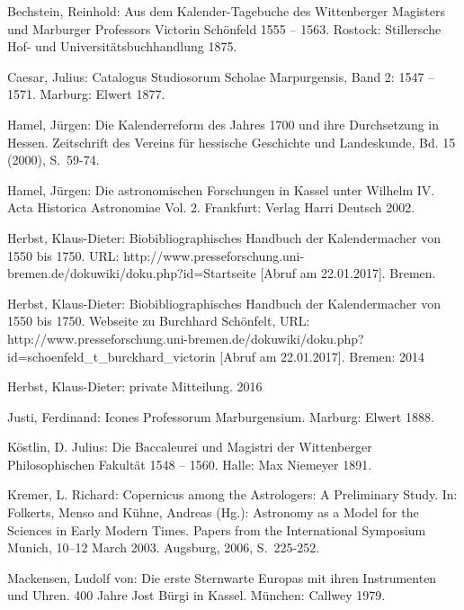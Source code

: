 \documentclass[12pt]{article}
\begin{document}
\begin{thebibliography}{}
	
	
 Bechstein, Reinhold: Aus dem Kalender-Tagebuche des Wittenberger Magisters und Marburger Professors Victorin Schönfeld 1555 -- 1563. Rostock: Stillersche Hof- und Universitätsbuchhandlung 1875.		

 Caesar, Julius:  Catalogus Studiosorum Scholae Marpurgensis, Band 2: 1547 -- 1571. Marburg: Elwert 1877.

 Hamel, Jürgen: Die Kalenderreform des Jahres 1700 und ihre Durchsetzung in Hessen. Zeitschrift des Vereins für hessische Geschichte und Landeskunde, Bd. 15 (2000), S.\ 59-74.

 Hamel, Jürgen: Die astronomischen Forschungen in Kassel unter Wilhelm IV. Acta Historica Astronomiae Vol. 2. Frankfurt: Verlag Harri Deutsch 2002.


 Herbst, Klaus-Dieter: Biobibliographisches Handbuch der Kalendermacher von 1550 bis 1750.
URL: http://www.presseforschung.uni-bremen.de/dokuwiki/doku.php?id=Startseite [Abruf am 22.01.2017]. Bremen.

 Herbst, Klaus-Dieter: Biobibliographisches Handbuch der Kalendermacher von 1550 bis 1750. Webseite zu Burchhard Schönfelt,
URL: http://www.presseforschung.uni-bremen.de/dokuwiki/doku.php?id=schoenfeld\_t\_burckhard\_victorin [Abruf am 22.01.2017]. Bremen: 2014

 Herbst, Klaus-Dieter: private Mitteilung. 2016

 Justi, Ferdinand: Icones Professorum Marburgensium. Marburg: Elwert 1888.

 Köstlin, D. Julius: Die Baccaleurei und Magistri der Wittenberger Philosophischen Fakultät 1548 -- 1560. Halle: Max Niemeyer 1891.	

 Kremer, L. Richard: Copernicus among the Astrologers: A Preliminary Study. In: Folkerts, Menso and Kühne, Andreas (Hg.):  Astronomy as a Model for the Sciences in Early Modern Times. Papers from the International Symposium Munich, 10–12 March 2003. Augsburg, 2006, S.\ 225-252. 

 Mackensen, Ludolf von: 
Die erste Sternwarte Europas mit ihren Instrumenten und Uhren. 400 Jahre Jost Bürgi in Kassel. München: Callwey 1979.


\end{thebibliography}
\end{document}
